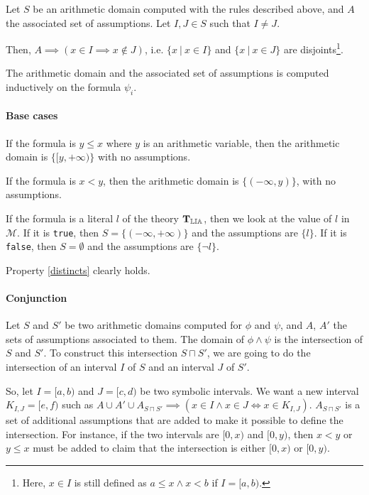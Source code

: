 \begin{property}[Distincts]

Let $S$ be an arithmetic domain computed with the rules described above, and $A$ the associated set of assumptions.
Let $I, J \in S$ such that $I \neq J$.

Then, $A \implies (x \in I \implies x \not\in J)$, i.e.
$\{x\ |\ x \in I\}$ and $\{x\ |\ x \in J\}$ are
disjoints\footnote{Here, $x \in I$ is still defined as $a \le x \land x < b$ if $I = [a, b)$.}.

\label{distincts}

\end{property}


The arithmetic domain and the associated set of assumptions is computed inductively on the formula
$\psi_i$.

\paragraph{Base cases}

If the formula is $y \le x$ where $y$ is an arithmetic variable, then the arithmetic domain is
$\{[y, +\infty)\}$ with no assumptions.

If the formula is $x < y$, then the arithmetic domain is $\{(-\infty, y)\}$, with no assumptions.

If the formula is a literal $l$ of the theory $\operatorname{\mathbf{T}_\mathbb{LIA}}$, then we look at the value of $l$ in
$\mathcal{M}$. If it is \texttt{true}, then $S = \{(-\infty, +\infty)\}$ and the assumptions are
$\{l\}$. If it is \texttt{false}, then $S = \emptyset$ and the assumptions are $\{\lnot l\}$.

Property \ref{distincts} clearly holds.

\paragraph{Conjunction}

Let $S$ and $S'$ be two arithmetic domains computed for $\phi$ and $\psi$, and $A$, $A'$ the sets of assumptions associated to
them. The domain of $\phi\land\psi$ is the intersection of $S$ and $S'$. To construct this intersection $S \sqcap S'$, we are going to
do the intersection of an interval $I$ of $S$ and an interval $J$
of $S'$.

So, let $I = [a, b)$ and $J = [c, d)$ be two symbolic intervals. We want a new
interval $K_{I, J} = [e, f)$ such as
$A \cup A' \cup A_{S \sqcap S'} \implies \left(x \in I \land x \in J \iff x \in K_{I, J}\right)$.
$A_{S \sqcap S'}$ is a set of additional assumptions that are added to make it possible to define
the
intersection. For instance, if the two intervals are $[0, x)$ and $[0, y)$, then $x < y$ or $y \le x$
must be added to claim that the intersection is either $[0, x)$ or $[0, y)$.

